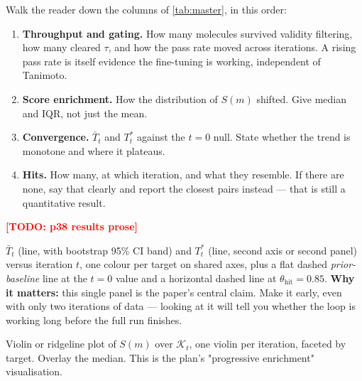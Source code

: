 \documentclass[11pt]{article}
\newcommand{\TODO}[1]{\textcolor{red}{\textbf{[TODO: #1]}}}
\newcommand{\TopK}{\mathcal{K}}                 %
\newcommand{\thetahit}{\theta_{\mathrm{hit}}}
\newcommand{\Tbar}{\bar{T}}
\newcommand{\Tstar}{T^{*}}
\begin{document}
\begin{yourturn}
Walk the reader down the columns of \cref{tab:master}, in this order:
\begin{enumerate}\itemsep0pt
  \item \textbf{Throughput and gating.} How many molecules survived validity
        filtering, how many cleared $\tau$, and how the pass rate moved across
        iterations. A rising pass rate is itself evidence the fine-tuning is
        working, independent of Tanimoto.
  \item \textbf{Score enrichment.} How the distribution of $S(m)$ shifted.
        Give median and IQR, not just the mean.
  \item \textbf{Convergence.} $\Tbar_t$ and $\Tstar_t$ against the $t=0$ null.
        State whether the trend is monotone and where it plateaus.
  \item \textbf{Hits.} How many, at which iteration, and what they resemble.
        If there are none, say that clearly and report the closest pairs
        instead --- that is still a quantitative result.
\end{enumerate}
\end{yourturn}

\TODO{p38 results prose}

\begin{figrec}
$\Tbar_t$ (line, with bootstrap 95\% CI band) and $\Tstar_t$ (line, second
axis or second panel) versus iteration $t$, one colour per target on shared
axes, plus a flat dashed \emph{prior-baseline} line at the $t=0$ value and a
horizontal dashed line at $\thetahit = 0.85$.
\textbf{Why it matters:} this single panel is the paper's central claim. Make
it early, even with only two iterations of data --- looking at it will tell you
whether the loop is working long before the full run finishes.
\end{figrec}

\begin{figrec}
Violin or ridgeline plot of $S(m)$ over $\TopK_t$, one violin per iteration,
faceted by target. Overlay the median. This is the plan's
"progressive enrichment" visualisation.
\end{figrec}

\end{document}
